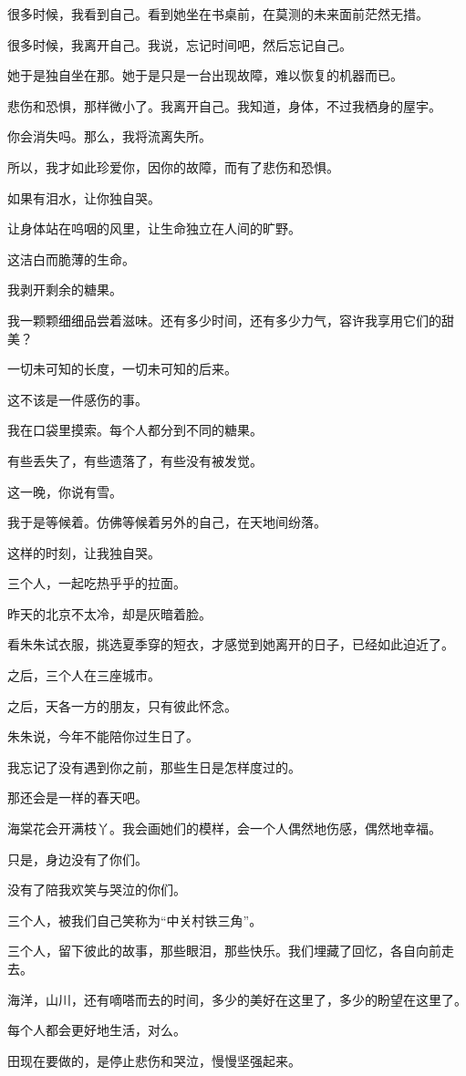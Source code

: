 		很多时候，我看到自己。看到她坐在书桌前，在莫测的未来面前茫然无措。\par
		很多时候，我离开自己。我说，忘记时间吧，然后忘记自己。\par
		她于是独自坐在那。她于是只是一台出现故障，难以恢复的机器而已。\par
		悲伤和恐惧，那样微小了。我离开自己。我知道，身体，不过我栖身的屋宇。\par
		你会消失吗。那么，我将流离失所。\par
		所以，我才如此珍爱你，因你的故障，而有了悲伤和恐惧。\par
		如果有泪水，让你独自哭。\par
		让身体站在呜咽的风里，让生命独立在人间的旷野。\par
		这洁白而脆薄的生命。

		我剥开剩余的糖果。\par
		我一颗颗细细品尝着滋味。还有多少时间，还有多少力气，容许我享用它们的甜美？\par
		一切未可知的长度，一切未可知的后来。\par
		这不该是一件感伤的事。\par
		我在口袋里摸索。每个人都分到不同的糖果。\par
		有些丢失了，有些遗落了，有些没有被发觉。

		这一晚，你说有雪。\par
		我于是等候着。仿佛等候着另外的自己，在天地间纷落。

		这样的时刻，让我独自哭。

	\endwriting



		三个人，一起吃热乎乎的拉面。\par
		昨天的北京不太冷，却是灰暗着脸。\par
		看朱朱试衣服，挑选夏季穿的短衣，才感觉到她离开的日子，已经如此迫近了。\par
		之后，三个人在三座城市。\par
		之后，天各一方的朋友，只有彼此怀念。\par
		朱朱说，今年不能陪你过生日了。\par
		我忘记了没有遇到你之前，那些生日是怎样度过的。\par
		那还会是一样的春天吧。\par
		海棠花会开满枝丫。我会画她们的模样，会一个人偶然地伤感，偶然地幸福。\par
		只是，身边没有了你们。\par
		没有了陪我欢笑与哭泣的你们。\par
		三个人，被我们自己笑称为“中关村铁三角”。\par
		三个人，留下彼此的故事，那些眼泪，那些快乐。我们埋藏了回忆，各自向前走去。\par
		海洋，山川，还有嘀嗒而去的时间，多少的美好在这里了，多少的盼望在这里了。\par
		每个人都会更好地生活，对么。\par
		田现在要做的，是停止悲伤和哭泣，慢慢坚强起来。

